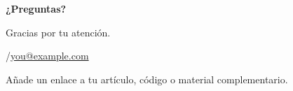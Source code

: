 \begin{frame}[plain]
\vfill
{\Huge\bfseries ¿Preguntas?}\par\vspace{5mm}
{\large\color{accent}Gracias por tu atención.}\par
{}\vspace{5mm}
\insertauthor\quad /\quad\href{mailto:you@example.com}{you@example.com}\par
{\small\color{muted}Añade un enlace a tu artículo, código o material complementario.}
\vfill
\end{frame}
